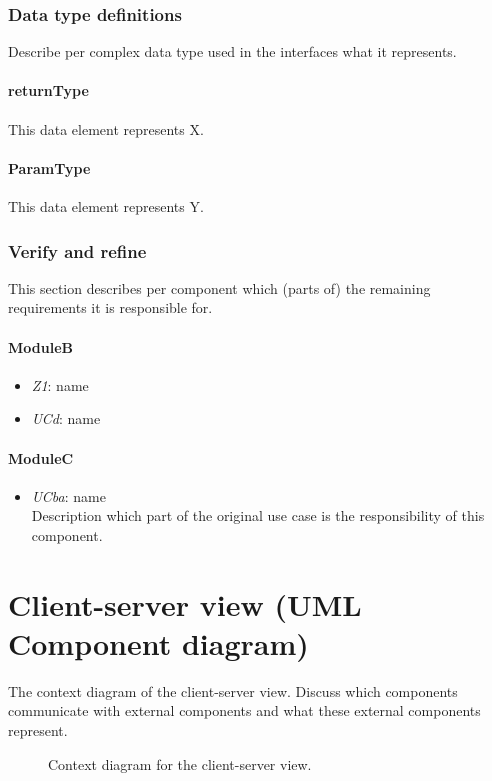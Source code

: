 \documentclass[a4paper,10pt]{article}
\begin{document}
\subsubsection{Data type definitions}
Describe per complex data type used in the interfaces what it represents.

\paragraph{returnType} This data element represents X.

\paragraph{ParamType} This data element represents Y.

\subsubsection{Verify and refine}
This section describes per component which (parts of) the remaining
requirements it is responsible for.

\paragraph{ModuleB}
\begin{itemize}
    \item \emph{Z1}: name
    \item \emph{UCd}: name
\end{itemize}

\paragraph{ModuleC}
\begin{itemize}
    \item \emph{UCba}: name\\Description which part of the original use case is
        the responsibility of this component.
\end{itemize}

\section{Client-server view (UML Component diagram)}\label{sec:client-server}
The context diagram of the client-server view.
Discuss which components communicate with external components and what these
external components represent.

\begin{figure}[!htp]
    \centering
    \caption{Context diagram for the client-server view.
        }\label{fig:cc-context}
\end{figure}
\end{document}
